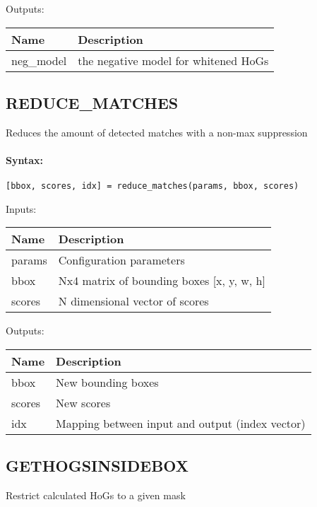 \bigskip
Outputs:

\begin{tabular}{|p{}|p{}|}
\hline
\textbf{Name} & \textbf{Description} \\
\hline \hline
neg\_model & the negative model for whitened HoGs  \\ \hline
\end{tabular}

\subsection{REDUCE\_MATCHES}

Reduces the amount of detected matches with a non-max suppression

\paragraph{Syntax:} \verb|[bbox, scores, idx] = reduce_matches(params, bbox, scores)|

\bigskip
Inputs:

\begin{tabular}{|p{}|p{}|}
\hline
\textbf{Name} & \textbf{Description} \\
\hline \hline
params & Configuration parameters  \\ \hline
bbox & Nx4 matrix of bounding boxes [x, y, w, h]  \\ \hline
scores & N dimensional vector of scores  \\ \hline
\end{tabular}

\bigskip
Outputs:

\begin{tabular}{|p{}|p{}|}
\hline
\textbf{Name} & \textbf{Description} \\
\hline \hline
bbox & New bounding boxes  \\ \hline
scores & New scores  \\ \hline
idx & Mapping between input and output (index vector)  \\ \hline
\end{tabular}

\subsection{GETHOGSINSIDEBOX}

Restrict calculated HoGs to a given mask

